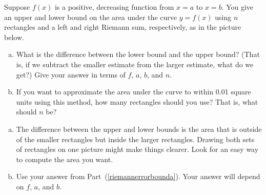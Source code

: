 \begin{question}\label{1.1errornotaylor}
Suppose $f(x)$ is a positive, decreasing function from $x=a$ to $x=b$. You give an upper and lower bound on the area under the curve $y=f(x)$ using $n$ rectangles and a left and right Riemann sum, respectively, as in the picture below.

\begin{center}
\hfill
{}
\end{center}
\begin{enumerate}[(a)]
\item\label{riemannerrorbounda} What is the difference between the lower bound and the upper bound? (That is, if we subtract the smaller estimate from the larger estimate, what do we get?) Give your answer in terms of $f$, $a$,  $b$, and $n$.
\item If you want to approximate the area under the curve to within 0.01 square units using this method, how many rectangles should you use? That is, what should $n$ be?
\end{enumerate}
\end{question}
\begin{hint}
\begin{enumerate}[(a)]
\item The difference between the upper and lower bounds is the area that is outside of the smaller rectangles but inside the larger rectangles.  Drawing both sets of rectangles on one picture might make things clearer. Look for an easy way to compute the area you want.
\item Use your answer from Part~(\ref{riemannerrorbounda}). Your answer will depend on $f$, $a$, and $b$.
\end{enumerate}
\end{hint}
